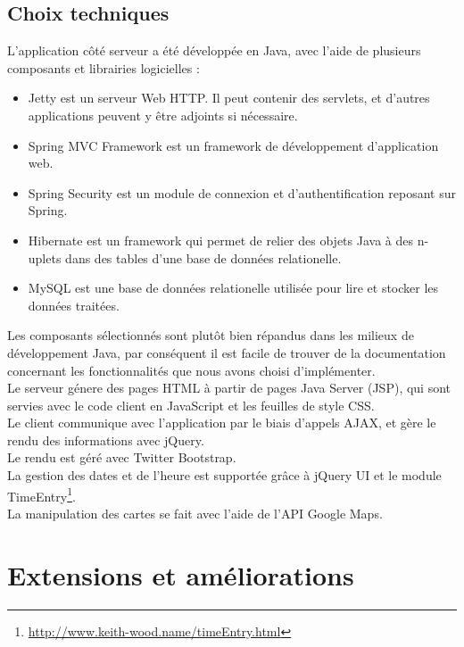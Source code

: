 \documentclass[11pt,a4paper,margin=0.5in]{report}
\begin{document}
\clearpage

\section{Choix techniques}

L'application côté serveur a été développée en Java, avec l'aide de plusieurs composants et librairies logicielles :

\begin{itemize}
    \item Jetty est un serveur Web HTTP. Il peut contenir des servlets, et d'autres applications peuvent y être adjoints si nécessaire. 
    \item Spring MVC Framework est un framework de développement d'application web.
    \item Spring Security est un module de connexion et d'authentification reposant sur Spring. 
    \item Hibernate est un framework qui permet de relier des objets Java à des n-uplets dans des tables d'une base de données relationelle.
    \item MySQL est une base de données relationelle utilisée pour lire et stocker les données traitées.
\end{itemize}

\vspace{0.5cm}

Les composants sélectionnés sont plutôt bien répandus dans les milieux de développement Java, 
par conséquent il est facile de trouver de la documentation concernant les fonctionnalités que nous avons choisi d'implémenter.\\[0.1in]

Le serveur génere des pages HTML à partir de pages Java Server (JSP), qui sont servies avec le code client en JavaScript et les feuilles de style CSS.\\[0.1in]
Le client communique avec l'application par le biais d'appels AJAX, et gère le rendu des informations avec jQuery.\\[0.1in]
Le rendu est géré avec Twitter Bootstrap.\\[0.1in]
La gestion des dates et de l'heure est supportée grâce à jQuery UI et le module TimeEntry\footnote{\url{http://www.keith-wood.name/timeEntry.html}}.\\[0.1in]
La manipulation des cartes se fait avec l'aide de l'API Google Maps.

\chapter{Extensions et améliorations}
\end{document}
